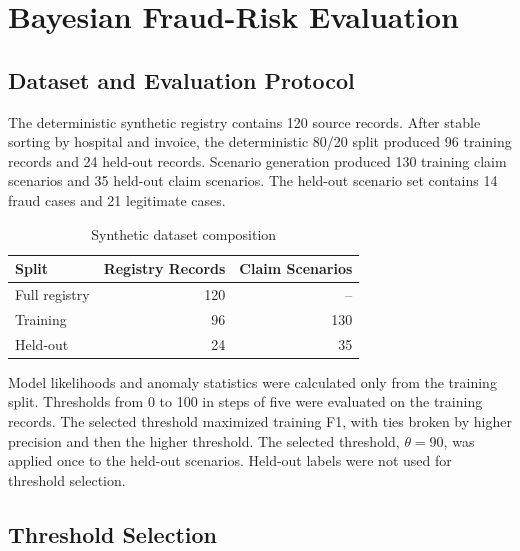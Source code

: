 \section{Bayesian Fraud-Risk Evaluation}
\label{sec:risk_results}

\subsection{Dataset and Evaluation Protocol}

The deterministic synthetic registry contains 120 source records. After stable
sorting by hospital and invoice, the deterministic 80/20 split produced 96
training records and 24 held-out records. Scenario generation produced 130
training claim scenarios and 35 held-out claim scenarios. The held-out scenario
set contains 14 fraud cases and 21 legitimate cases.

\begin{table}[htbp]
\centering
\caption{Synthetic dataset composition}
\label{tab:dataset_composition}
\begin{tabular}{|p{6.5cm}|r|r|}
\hline
\textbf{Split} & \textbf{Registry Records} & \textbf{Claim Scenarios} \\
\hline
Full registry & 120 & -- \\
\hline
Training & 96 & 130 \\
\hline
Held-out & 24 & 35 \\
\hline
\end{tabular}
\end{table}

Model likelihoods and anomaly statistics were calculated only from the training
split. Thresholds from 0 to 100 in steps of five were evaluated on the training
records. The selected threshold maximized training F1, with ties broken by
higher precision and then the higher threshold. The selected threshold,
\(\theta=90\), was applied once to the held-out scenarios. Held-out labels were
not used for threshold selection.

\subsection{Threshold Selection}


